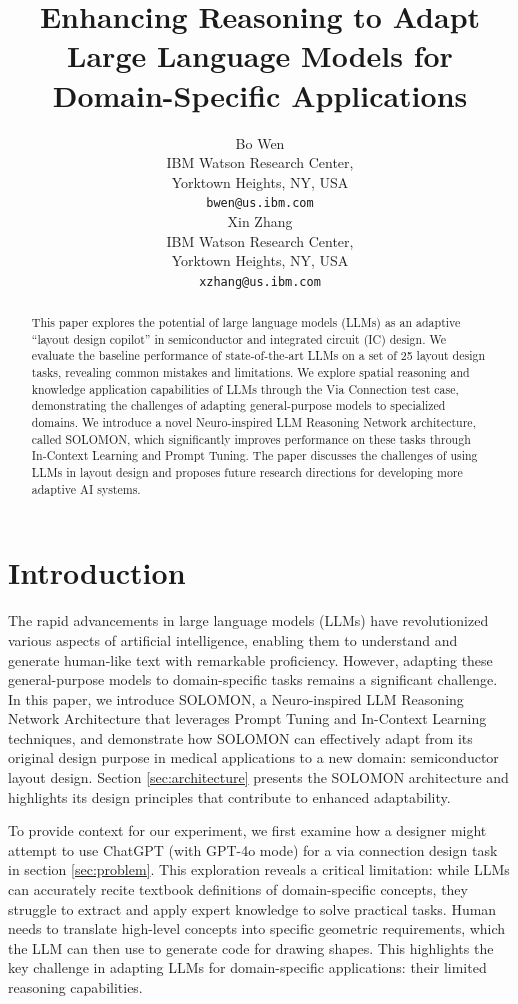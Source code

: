\documentclass{article}
\title{Enhancing Reasoning to Adapt Large Language Models for Domain-Specific Applications}
\author{%
  Bo Wen\\
  IBM Watson Research Center, \\
  Yorktown Heights, NY, USA \\
  \texttt{bwen@us.ibm.com} \\
  \And
  Xin Zhang\\
  IBM Watson Research Center, \\
  Yorktown Heights, NY, USA \\
  \texttt{xzhang@us.ibm.com} \\
}
\begin{document}
\maketitle

\begin{abstract}
  This paper explores the potential of large language models (LLMs) as an adaptive ``layout design copilot'' in semiconductor and integrated circuit (IC) design. We evaluate the baseline performance of state-of-the-art LLMs on a set of 25 layout design tasks, revealing common mistakes and limitations. We explore spatial reasoning and knowledge application capabilities of LLMs through the Via Connection test case, demonstrating the challenges of adapting general-purpose models to specialized domains. We introduce a novel Neuro-inspired LLM Reasoning Network architecture, called SOLOMON, which significantly improves performance on these tasks through In-Context Learning and Prompt Tuning. The paper discusses the challenges of using LLMs in layout design and proposes future research directions for developing more adaptive AI systems.
\end{abstract}

\section{Introduction}
The rapid advancements in large language models (LLMs) have revolutionized various aspects of artificial intelligence, enabling them to understand and generate human-like text with remarkable proficiency. However, adapting these general-purpose models to domain-specific tasks remains a significant challenge. In this paper, we introduce SOLOMON, a Neuro-inspired LLM Reasoning Network Architecture that leverages Prompt Tuning and In-Context Learning techniques, and demonstrate how SOLOMON can effectively adapt from its original design purpose in medical applications to a new domain: semiconductor layout design. Section \ref{sec:architecture} presents the SOLOMON architecture and highlights its design principles that contribute to enhanced adaptability.

To provide context for our experiment, we first examine how a designer might attempt to use ChatGPT (with GPT-4o mode) for a via connection design task in section \ref{sec:problem}. This exploration reveals a critical limitation: while LLMs can accurately recite textbook definitions of domain-specific concepts, they struggle to extract and apply expert knowledge to solve practical tasks. Human needs to translate high-level concepts into specific geometric requirements, which the LLM can then use to generate code for drawing shapes. This highlights the key challenge in adapting LLMs for domain-specific applications: their limited reasoning capabilities.
\end{document}
